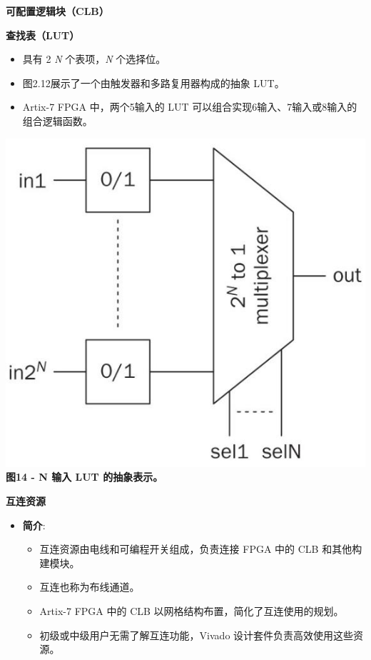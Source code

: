 \begin{frame}[allowframebreaks]{\textbf{可配置逻辑块（CLB）}}
\begin{block}{\textbf{查找表（LUT）}}
\begin{itemize}
    \begin{itemize}
    \tightlist
    \item
    具有 2 \emph{N} 个表项，\emph{N} 个选择位。
    \item
    图2.12展示了一个由触发器和多路复用器构成的抽象 LUT。
    \item
    Artix-7 FPGA 中，两个5输入的 LUT
    可以组合实现6输入、7输入或8输入的组合逻辑函数。
    \end{itemize}
\end{itemize}

\includegraphics[keepaspectratio]{img1/XC7A35LUT.jpeg}\\
\textbf{图14 - N 输入 LUT 的抽象表示。}
\end{block}
\end{frame}

\begin{frame}{\textbf{互连资源}}
\label{ux4e92ux8fdeux8d44ux6e90}
\begin{itemize}
\tightlist
\item
    \textbf{简介}:

    \begin{itemize}
    \tightlist
    \item
    互连资源由电线和可编程开关组成，负责连接 FPGA 中的 CLB
    和其他构建模块。
    \item
    互连也称为布线通道。
    \item
    Artix-7 FPGA 中的 CLB 以网格结构布置，简化了互连使用的规划。
    \item
    初级或中级用户无需了解互连功能，Vivado
    设计套件负责高效使用这些资源。
    \end{itemize}
\end{itemize}
\end{frame}

